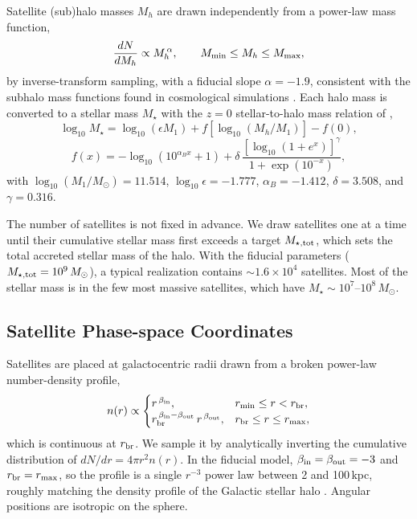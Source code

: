 Satellite (sub)halo masses $M_h$ are drawn independently from a power-law mass function,
\begin{equation}
    \frac{dN}{dM_h} \propto M_h^{\,\alpha}, \qquad M_{\rm min} \le M_h \le M_{\rm max},
    \label{eq:hmf}
\end{equation}
by inverse-transform sampling, with a fiducial slope $\alpha = -1.9$, consistent with the
subhalo mass functions found in cosmological simulations \citep[e.g.,][]{Springel2008}.
Each halo mass is converted to a stellar mass $M_\star$ with the $z=0$ stellar-to-halo mass
relation of \citet[][their Equation~3]{Behroozi2013},
\begin{equation}
    \log_{10} M_\star = \log_{10}(\epsilon M_1) + f\!\left[\log_{10}(M_h/M_1)\right] - f(0),
\end{equation}
\begin{equation}
    f(x) = -\log_{10}\!\left(10^{\alpha_B x} + 1\right)
           + \delta\,\frac{\left[\log_{10}(1 + e^{x})\right]^{\gamma}}{1 + \exp(10^{-x})},
\end{equation}
with $\log_{10}(M_1/M_\odot) = 11.514$, $\log_{10}\epsilon = -1.777$, $\alpha_B = -1.412$,
$\delta = 3.508$, and $\gamma = 0.316$.

The number of satellites is not fixed in advance. We draw satellites one at a time until
their cumulative stellar mass first exceeds a target $M_{\star,\rm tot}$, which sets the
total accreted stellar mass of the halo. With the fiducial parameters
($M_{\star,\rm tot} = 10^{9}\,M_\odot$), a typical realization contains
$\sim\!1.6\times10^{4}$ satellites. Most of the stellar mass is in the few most massive
satellites, which have $M_\star \sim 10^{7}$--$10^{8}\,M_\odot$.

\subsection{Satellite Phase-space Coordinates} \label{sec:mock_phase}

Satellites are placed at galactocentric radii drawn from a broken power-law number-density
profile,
\begin{equation}
    n(r) \propto
    \begin{cases}
        r^{\,\beta_{\rm in}},  & r_{\rm min} \le r < r_{\rm br}, \\
        r_{\rm br}^{\,\beta_{\rm in}-\beta_{\rm out}}\, r^{\,\beta_{\rm out}},
                               & r_{\rm br} \le r \le r_{\rm max},
    \end{cases}
    \label{eq:nr}
\end{equation}
which is continuous at $r_{\rm br}$. We sample it by analytically inverting the cumulative
distribution of $dN/dr = 4\pi r^2 n(r)$. In the fiducial model,
$\beta_{\rm in} = \beta_{\rm out} = -3$ and $r_{\rm br} = r_{\rm max}$, so the profile is a
single $r^{-3}$ power law between 2 and 100\,kpc, roughly matching the density profile of
the Galactic stellar halo \citep[e.g.,][]{Deason2011}. Angular positions are isotropic on the
sphere.

